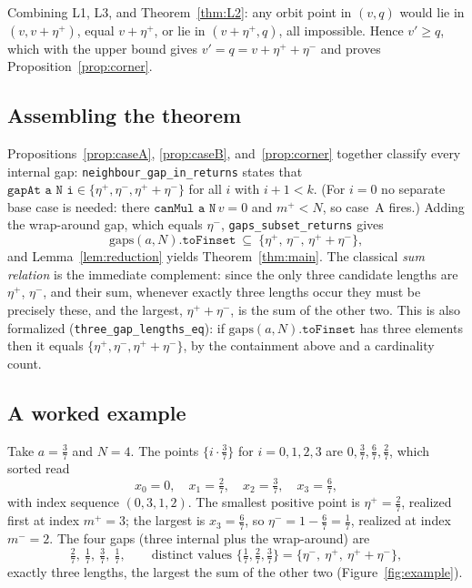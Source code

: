\documentclass[11pt,reqno]{amsart}
\theoremstyle{plain}
\theoremstyle{definition}
\theoremstyle{remark}
\newcommand{\fract}[1]{\{#1\}}
\newcommand{\etap}{\eta^{+}}
\newcommand{\etam}{\eta^{-}}
\newcommand{\mpl}{m^{+}}
\newcommand{\mmi}{m^{-}}
\newcommand{\code}[1]{\texttt{#1}}
\begin{document}
Combining L1, L3, and Theorem~\ref{thm:L2}: any orbit point in $(v,q)$ would lie
in $(v,v+\etap)$, equal $v+\etap$, or lie in $(v+\etap,q)$, all impossible.
Hence $v'\ge q$, which with the upper bound gives $v'=q=v+\etap+\etam$ and proves
Proposition~\ref{prop:corner}.

\subsection{Assembling the theorem}\label{subsec:assemble}

Propositions~\ref{prop:caseA}, \ref{prop:caseB}, and~\ref{prop:corner} together
classify every internal gap: \code{neighbour\_gap\_in\_returns} states that
$\code{gapAt a N i}\in\{\etap,\etam,\etap+\etam\}$ for all $i$ with $i+1<k$.
(For $i=0$ no separate base case is needed: there $\code{canMul a N}\,v=0$ and
$\mpl<N$, so case~A fires.)  Adding the wrap-around gap, which equals $\etam$,
\code{gaps\_subset\_returns} gives
\[
  \mathrm{gaps}(a,N).\code{toFinset}\ \subseteq\ \{\etap,\,\etam,\,\etap+\etam\},
\]
and Lemma~\ref{lem:reduction} yields Theorem~\ref{thm:main}.  The classical
\emph{sum relation} is the immediate complement: since the only three candidate
lengths are $\etap$, $\etam$, and their sum, whenever exactly three lengths occur
they must be precisely these, and the largest, $\etap+\etam$, is the sum of the
other two.  This is also formalized (\code{three\_gap\_lengths\_eq}): if
$\mathrm{gaps}(a,N).\code{toFinset}$ has three elements then it equals
$\{\etap,\etam,\etap+\etam\}$, by the containment above and a cardinality count.

\subsection{A worked example}\label{subsec:example}

Take $a=\tfrac37$ and $N=4$.  The points $\fract{i\cdot\tfrac37}$ for
$i=0,1,2,3$ are $0,\tfrac37,\tfrac67,\tfrac27$, which sorted read
\[
  x_0=0,\quad x_1=\tfrac27,\quad x_2=\tfrac37,\quad x_3=\tfrac67,
\]
with index sequence $(0,3,1,2)$.  The smallest positive point is
$\etap=\tfrac27$, realized first at index $\mpl=3$; the largest is
$x_3=\tfrac67$, so $\etam=1-\tfrac67=\tfrac17$, realized at index $\mmi=2$.  The
four gaps (three internal plus the wrap-around) are
\[
  \tfrac27,\ \tfrac17,\ \tfrac37,\ \tfrac17,
  \qquad\text{distinct values } \{\tfrac17,\tfrac27,\tfrac37\}
  = \{\etam,\ \etap,\ \etap+\etam\},
\]
exactly three lengths, the largest the sum of the other two
(Figure~\ref{fig:example}).
\end{document}
